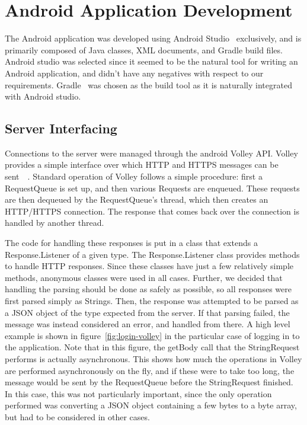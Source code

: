 \documentclass[12pt]{report}
\let\Oldsection\section
\renewcommand{\section}{\FloatBarrier\Oldsection}
\let\Oldsubsection\subsection
\renewcommand{\subsection}{\FloatBarrier\Oldsubsection}
\begin{document}

\section{Android Application Development} \label{android-application-development}

The Android application was developed using Android Studio~\autocite{ANDROIDSTUDIO} exclusively, and is primarily composed of Java classes, XML
documents, and Gradle build files. Android studio was selected since it seemed to be the natural tool for writing an
Android application, and didn't have any negatives with respect to our requirements. Gradle~\autocite{GRADLE} was chosen as the build
tool as it is naturally integrated with Android studio.


\subsection{Server Interfacing} \label{server-interfacing}

Connections to the server were managed through the android Volley API. Volley provides a simple interface over which
HTTP and HTTPS messages can be sent~\autocite{ANDROIDVOLLEY}~\autocite{VOLLEY}.
Standard operation of Volley follows a simple procedure: first a RequestQueue is
set up, and then various Requests are enqueued. These requests are then dequeued by the RequestQueue's thread, which
then creates an HTTP/HTTPS connection. The response that comes back over the connection is handled by another thread.

The code for handling these responses is put in a class that extends a Response.Listener of a given type. The
Response.Listener class provides methods to handle HTTP responses. Since these classes have just a few relatively simple
methods, anonymous classes were used in all cases. Further, we decided that handling the parsing should be done as
safely as possible, so all responses were first parsed simply as Strings. Then, the response was attempted to be parsed
as a JSON object of the type expected from the server. If that parsing failed, the message was instead considered an
error, and handled from there. A high level example is shown in figure~\ref{fig:login-volley} in the particular case of
logging in to the application. Note that in this figure, the getBody call that the StringRequest performs is actually
asynchronous. This shows how much the operations in Volley are performed asynchronously on the fly, and if these were
to take too long, the message would be sent by the RequestQueue before the StringRequest finished. In this case, this
was not particularly important, since the only operation performed was converting a JSON object containing a few bytes
to a byte array, but had to be considered in other cases.
\end{document}
